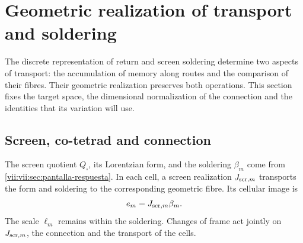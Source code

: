 
\section{Geometric realization of transport and soldering}
\label{vii:vii:sec:realizacion-cartan}

The discrete representation of return and screen soldering
determine two aspects of transport: the accumulation of memory along
routes and the comparison of their fibres. Their geometric realization
preserves both operations. This section fixes the target
space, the dimensional normalization of the connection and the identities
that its variation will use.

\subsection{Screen, co-tetrad and connection}

The screen quotient \(Q_\square\), its Lorentzian form, and the
soldering \(\beta_m\) come from
\ref{vii:vii:sec:pantalla-respuesta}. In each cell, a screen realization
\(J_{{\rm scr},m}\) transports the form and soldering to the
corresponding geometric fibre. Its cellular image is
\[
 e_m=J_{{\rm scr},m}\beta_m.
\]
The scale \(\ell_m\) remains within the soldering. Changes
of frame act jointly on \(J_{{\rm scr},m}\), the connection
and the transport of the cells.

